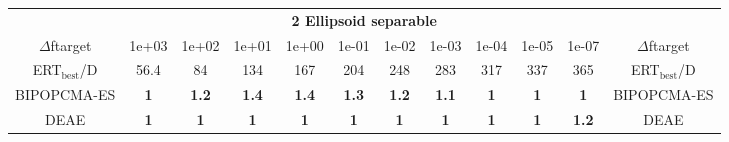 \begin{tabular}{cccccccccccc}
 & \multicolumn{10}{c}{{\normalsize \textbf{2 Ellipsoid separable}}}\\
$\Delta$ftarget& 1e+03& 1e+02& 1e+01& 1e+00& 1e-01& 1e-02& 1e-03& 1e-04& 1e-05& 1e-07 & $\Delta$ftarget \\
ERT$_{\textrm{best}}$/D& 56.4& 84& 134& 167& 204& 248& 283& 317& 337& 365 & ERT$_{\textrm{best}}$/D \\
\hline
BIPOPCMA-ES & \textbf{1} & \textbf{1.2} & \textbf{1.4} & \textbf{1.4} & \textbf{1.3} & \textbf{1.2} & \textbf{1.1} & \textbf{1} & \textbf{1} & \textbf{1} & BIPOPCMA-ES \cite{add_an_entry_for_BIPOPCMA-ES_in_bbob.bib}\\
DEAE & \textbf{1} & \textbf{1} & \textbf{1} & \textbf{1} & \textbf{1} & \textbf{1} & \textbf{1} & \textbf{1} & \textbf{1} & \textbf{1.2} & DEAE \cite{add_an_entry_for_DEAE_in_bbob.bib}
\end{tabular}
